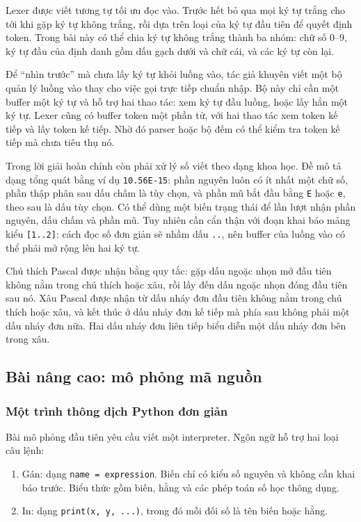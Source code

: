 \documentclass[11pt]{article}
\begin{document}
Lexer được viết tương tự tối ưu đọc vào. Trước hết bỏ qua mọi ký tự trắng cho
tới khi gặp ký tự không trắng, rồi dựa trên loại của ký tự đầu tiên để quyết
định token. Trong bài này có thể chia ký tự không trắng thành ba nhóm: chữ số
\(0\)--\(9\), ký tự đầu của định danh gồm dấu gạch dưới và chữ cái, và các ký
tự còn lại.

Để ``nhìn trước'' mà chưa lấy ký tự khỏi luồng vào, tác giả khuyên viết một bộ
quản lý luồng vào thay cho việc gọi trực tiếp chuẩn nhập. Bộ này chỉ cần một
buffer một ký tự và hỗ trợ hai thao tác: xem ký tự đầu luồng, hoặc lấy hẳn một
ký tự. Lexer cũng có buffer token một phần tử, với hai thao tác xem token kế
tiếp và lấy token kế tiếp. Nhờ đó parser hoặc bộ đếm có thể kiểm tra token kế
tiếp mà chưa tiêu thụ nó.

Trong lời giải hoàn chỉnh còn phải xử lý số viết theo dạng khoa học. Đề mô tả
dạng tổng quát bằng ví dụ \texttt{10.56E-15}: phần nguyên luôn có ít nhất một
chữ số, phần thập phân sau dấu chấm là tùy chọn, và phần mũ bắt đầu bằng
\texttt{E} hoặc \texttt{e}, theo sau là dấu tùy chọn. Có thể dùng một biến trạng
thái để lần lượt nhận phần nguyên, dấu chấm và phần mũ. Tuy nhiên cần cẩn thận
với đoạn khai báo mảng kiểu \texttt{[1..2]}: cách đọc số đơn giản sẽ nhầm dấu
\texttt{..}, nên buffer của luồng vào có thể phải mở rộng lên hai ký tự.

Chú thích Pascal được nhận bằng quy tắc: gặp dấu ngoặc nhọn mở đầu tiên không
nằm trong chú thích hoặc xâu, rồi lấy đến dấu ngoặc nhọn đóng đầu tiên sau nó.
Xâu Pascal được nhận từ dấu nháy đơn đầu tiên không nằm trong chú thích hoặc
xâu, và kết thúc ở dấu nháy đơn kế tiếp mà phía sau không phải một dấu nháy đơn
nữa. Hai dấu nháy đơn liên tiếp biểu diễn một dấu nháy đơn bên trong xâu.

\subsection{Bài nâng cao: mô phỏng mã nguồn}

\subsubsection{Một trình thông dịch Python đơn giản}

Bài mô phỏng đầu tiên yêu cầu viết một interpreter. Ngôn ngữ hỗ trợ hai loại
câu lệnh:

\begin{enumerate}
  \item Gán: dạng \texttt{name = expression}. Biến chỉ có kiểu số nguyên và không cần
  khai báo trước. Biểu thức gồm biến, hằng và các phép toán số học thông dụng.
  \item In: dạng \texttt{print(x, y, ...)}, trong đó mỗi đối số là tên biến
  hoặc hằng.
\end{enumerate}
\end{document}
